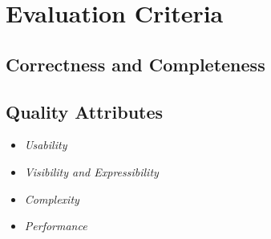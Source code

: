
\section{Evaluation Criteria}
\label{sec:EvaluationCriteria}

\subsection{Correctness and Completeness}


\subsection{Quality Attributes}

\begin{itemize}
  \item \emph{Usability}
  \item \emph{Visibility and Expressibility}
  \item \emph{Complexity}
  \item \emph{Performance}
\end{itemize}

